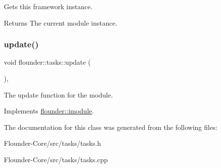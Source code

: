 Gets this framework instance. 

\begin{DoxyReturn}{Returns}
The current module instance. 
\end{DoxyReturn}
\mbox{\label{classflounder_1_1tasks_a32e51c65b63e8c98097d5d40c1912e5c}} 
\subsubsection{\texorpdfstring{update()}{update()}}
{\footnotesize\ttfamily void flounder\+::tasks\+::update (\begin{DoxyParamCaption}{ }\end{DoxyParamCaption})\hspace{0.3cm}{\ttfamily [override]}, {\ttfamily [virtual]}}



The update function for the module. 



Implements \hyperlink{classflounder_1_1imodule_a9a53d48a46b5f6b16a92b2cd8503f74a}{flounder\+::imodule}.



The documentation for this class was generated from the following files\+:\begin{DoxyCompactItemize}
\item 
Flounder-\/\+Core/src/tasks/tasks.\+h\item 
Flounder-\/\+Core/src/tasks/tasks.\+cpp\end{DoxyCompactItemize}
